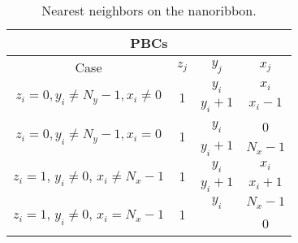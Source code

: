 \begin{table}[H]
	\hspace{-2.5cm}
	\caption{Nearest neighbors on the nanoribbon.}
	\begin{tabular}{|c|c|c|c|} \hline
	\multicolumn{4}{|c|}{\textbf{\acp{PBC}}}							\\ \hline
		Case 				& $z_j$	& $y_j$	& $x_j$ 	\\ \hline
		\multicolumn{1}{|c|}{\multirow{3}{*}{$z_i = 0, y_i \neq N_y - 1, x_i \neq 0$}}	 &	\multicolumn{1}{c|}{\multirow{3}{*}{1}} & \multicolumn{1}{c|}{\multirow{2}{*}{$y_i$}} & $x_i$   \\ \cline{4-4}
	   	\multicolumn{1}{|c|}{}	& \multicolumn{1}{c|}{\multirow{3}{*}{}} & \multicolumn{1}{c|}{\multirow{2}{*}{}}& \multicolumn{1}{c|}{\multirow{2}{*}{$x_i - 1$}} \\ \cline{3-3}
	   	\multicolumn{1}{|c|}{}	& \multicolumn{1}{c|}{} & $y_i +1$ & \multicolumn{1}{c|}{\multirow{2}{*}{}} \\ \hline
		\multicolumn{1}{|c|}{\multirow{3}{*}{$z_i = 0, y_i \neq N_y - 1, x_i = 0$}}	 &	\multicolumn{1}{c|}{\multirow{3}{*}{1}} & \multicolumn{1}{c|}{\multirow{2}{*}{$y_i$}} & 0   \\ \cline{4-4}
	   	\multicolumn{1}{|c|}{}	& \multicolumn{1}{c|}{\multirow{3}{*}{}} & \multicolumn{1}{c|}{\multirow{2}{*}{}}& \multicolumn{1}{c|}{\multirow{2}{*}{$N_x - 1$}} \\ \cline{3-3}
	   	\multicolumn{1}{|c|}{}	& \multicolumn{1}{c|}{} & $y_i +1$ & \multicolumn{1}{c|}{\multirow{2}{*}{}} \\ \hline
		\multicolumn{1}{|c|}{\multirow{3}{*}{$z_i = 1$, $y_i \neq 0$, $x_i \neq N_x - 1$}}	 &	\multicolumn{1}{c|}{\multirow{3}{*}{1}} & \multicolumn{1}{c|}{\multirow{2}{*}{$y_i$}} & $x_i$   \\ \cline{4-4}
	   	\multicolumn{1}{|c|}{}	& \multicolumn{1}{c|}{\multirow{3}{*}{}} & \multicolumn{1}{c|}{\multirow{2}{*}{}}& \multicolumn{1}{c|}{\multirow{2}{*}{$x_i + 1$}} \\ \cline{3-3}
	   	\multicolumn{1}{|c|}{}	& \multicolumn{1}{c|}{} & $y_i +1$ & \multicolumn{1}{c|}{\multirow{2}{*}{}} \\ \hline
		\multicolumn{1}{|c|}{\multirow{3}{*}{$z_i = 1$, $y_i \neq 0$, $x_i = N_x - 1$}}	 &	\multicolumn{1}{c|}{\multirow{3}{*}{1}} & \multicolumn{1}{c|}{\multirow{2}{*}{$y_i$}} & $N_x - 1$   \\ \cline{4-4}
	   	\multicolumn{1}{|c|}{}	& \multicolumn{1}{c|}{\multirow{3}{*}{}} & \multicolumn{1}{c|}{\multirow{2}{*}{}}& \multicolumn{1}{c|}{\multirow{2}{*}{0}} \\ \cline{3-3}

\end{tabular}
\end{table}
